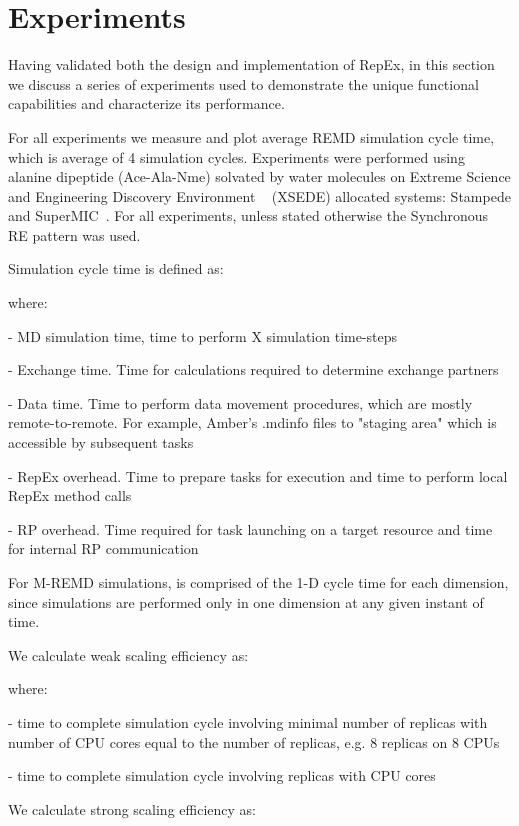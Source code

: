 \documentclass{sig-alternate-05-2015}
\begin{document}
\section{Experiments} \label{experiments}

Having validated both the design and implementation of RepEx, in this section we discuss a series of experiments used to demonstrate the unique functional capabilities and characterize its performance.

For all experiments we measure and plot average REMD simulation cycle time, which is average of 4 simulation cycles. Experiments were performed using alanine dipeptide (Ace-Ala-Nme) solvated by water molecules on Extreme Science and Engineering Discovery Environment ~\cite{xsede} (XSEDE) allocated systems: Stampede and SuperMIC~\cite{xsede}. For all experiments, unless stated otherwise the Synchronous RE pattern was used.

Simulation cycle time is defined as:   

where:
\begin{compactitem}
  \item  - MD simulation time, time to perform X simulation time-steps  
  \item  - Exchange time. Time for calculations required to determine exchange partners
  \item  - Data time. Time to perform data movement procedures, which are mostly remote-to-remote. For example, Amber's .mdinfo files to "staging area" which is accessible by subsequent tasks
  \item  - RepEx overhead. Time to prepare tasks for execution and time to perform local RepEx method calls
  \item  - RP overhead. Time required for task launching on a target resource and time for internal RP communication
\end{compactitem}

For M-REMD simulations,  is comprised of the 1-D cycle time for each dimension, since simulations are performed only in one dimension at any given instant of time.

We calculate weak scaling efficiency as:

where:
\begin{compactitem}
  \item  - time to complete simulation cycle involving minimal number of replicas  with number of CPU cores equal to the number of replicas, e.g. 8 replicas on 8 CPUs
  \item  - time to complete simulation cycle involving  replicas with  CPU cores
\end{compactitem}
We calculate strong scaling efficiency as:
\end{document}
